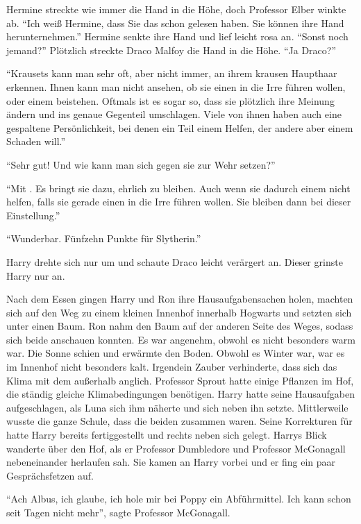 Hermine streckte wie immer die Hand in die Höhe, doch Professor Elber winkte ab. \enquote{Ich weiß Hermine, dass Sie das schon gelesen haben. Sie können ihre Hand herunternehmen.} Hermine senkte ihre Hand und lief leicht rosa an. \enquote{Sonst noch jemand?} Plötzlich streckte Draco Malfoy die Hand in die Höhe. \enquote{Ja Draco?}

\enquote{Krausets kann man sehr oft, aber nicht immer, an ihrem krausen Haupthaar erkennen. Ihnen kann man nicht ansehen, ob sie einen in die Irre führen wollen, oder einem beistehen. Oftmals ist es sogar so, dass sie plötzlich ihre Meinung ändern und ins genaue Gegenteil umschlagen. Viele von ihnen haben auch eine gespaltene Persönlichkeit, bei denen ein Teil einem Helfen, der andere aber einem Schaden will.}

\enquote{Sehr gut! Und wie kann man sich gegen sie zur Wehr setzen?}

\enquote{Mit . Es bringt sie dazu, ehrlich zu bleiben. Auch wenn sie dadurch einem nicht helfen, falls sie gerade einen in die Irre führen wollen. Sie bleiben dann bei dieser Einstellung.}

\enquote{Wunderbar. Fünfzehn Punkte für Slytherin.}

Harry drehte sich nur um und schaute Draco leicht verärgert an. Dieser grinste Harry nur an.

\trenn

Nach dem Essen gingen Harry und Ron ihre Hausaufgabensachen holen, machten sich auf den Weg zu einem kleinen Innenhof innerhalb Hogwarts und setzten sich unter einen Baum. Ron nahm den Baum auf der anderen Seite des Weges, sodass sich beide anschauen konnten. Es war angenehm, obwohl es nicht besonders warm war. Die Sonne schien und erwärmte den Boden. Obwohl es Winter war, war es im Innenhof nicht besonders kalt. Irgendein Zauber verhinderte, dass sich das Klima mit dem außerhalb anglich. Professor Sprout hatte einige Pflanzen im Hof, die ständig gleiche Klimabedingungen benötigen. Harry hatte seine Hausaufgaben aufgeschlagen, als Luna sich ihm näherte und sich neben ihn setzte. Mittlerweile wusste die ganze Schule, dass die beiden zusammen waren. Seine Korrekturen für  hatte Harry bereits fertiggestellt und rechts neben sich gelegt. Harrys Blick wanderte über den Hof, als er Professor Dumbledore und Professor McGonagall nebeneinander herlaufen sah. Sie kamen an Harry vorbei und er fing ein paar Gesprächsfetzen auf.

\enquote{Ach Albus, ich glaube, ich hole mir bei Poppy ein Abführmittel. Ich kann schon seit Tagen nicht mehr}, sagte Professor McGonagall.

